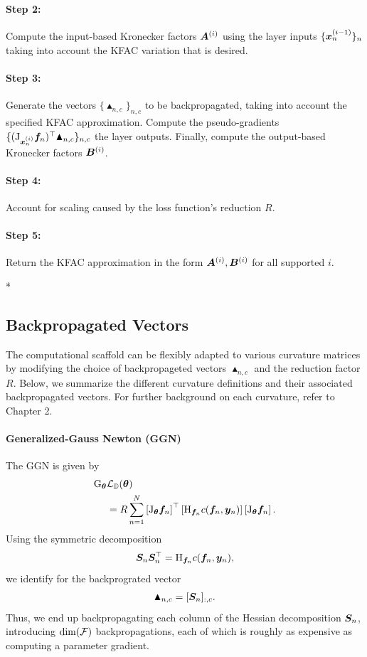 \paragraph{Step 2:} Compute the input-based Kronecker factors ${\bm{A}}^{(i)}$ using the layer inputs $\{{\bm{x}}_n^{(i-1)}\}_n$ taking into account the KFAC variation that is desired.

\paragraph{Step 3:} Generate the vectors $\{\blacktriangle_{n,c}\}_{n,c}$ to be backpropagated, taking into account the specified KFAC approximation. Compute the pseudo-gradients $\{(\mathrm{J}_{{\bm{x}}_n^{(i)}} {\bm{f}}_n)^{\top} \blacktriangle_{n,c} \}_{n,c}$ \wrt the layer outputs. Finally, compute the output-based Kronecker factors ${\bm{B}}^{(i)}$.%

\paragraph{Step 4:} Account for scaling caused by the loss function's reduction $R$.

\paragraph{Step 5:} Return the KFAC approximation in the form ${\bm{A}}^{(i)}, {\bm{B}}^{(i)}$ for all supported $i$.

\switchcolumn[1]*
\switchcolumn[0]

\subsection{Backpropagated Vectors}
The computational scaffold can be flexibly adapted to various curvature matrices by modifying the choice of backpropageted vectors $\blacktriangle_{n,c}$ and the reduction factor $R$. Below, we summarize the different curvature definitions and their associated backpropagated vectors. For further background on each curvature, refer to Chapter 2.

\paragraph{Generalized-Gauss Newton (GGN)}
The GGN is given by\begin{align*}
\mathrm{G}_{{\bm{\theta}}}&{\mathcal{L}}_{{\mathbb{D}}}({\bm{\theta}}) \\
&= R \sum_{n=1}^N
  \left[\mathrm{J}_{{\bm{\theta}}} {\bm{f}}_n\right]^{\top}
  \left[\mathrm{H}_{{\bm{f}}_n} c({\bm{f}}_n, {\bm{y}}_n)
  \right]
  \left[\mathrm{J}_{{\bm{\theta}}} {\bm{f}}_n\right].
\end{align*}
Using the symmetric decomposition
$${\bm{S}}_n {\bm{S}}_n^{\top} = \mathrm{H}_{{\bm{f}}_n} c({\bm{f}}_n, {\bm{y}}_n),$$ we identify for the backprograted vector
\begin{align*}
  \blacktriangle_{n,c} = [{\bm{S}}_n]_{:,c}.
\end{align*}
Thus, we end up backpropagating each column of the Hessian decomposition ${\bm{S}}_n$, introducing $\dim({\mathcal{F}})$ backpropagations, each of which is roughly as expensive as computing a parameter gradient.

